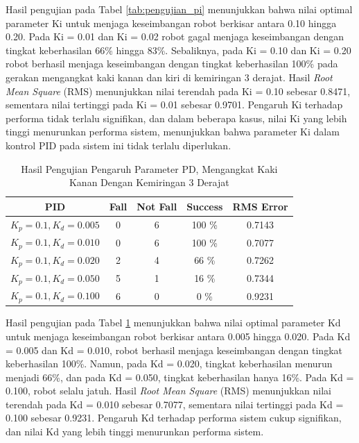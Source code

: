 \begin{enumerate}[label=\Alph*.]
        \hspace*{1em} Hasil pengujian pada Tabel \ref{tab:pengujian_pi} menunjukkan bahwa nilai optimal parameter Ki untuk menjaga keseimbangan robot berkisar antara 0.10 hingga 0.20. Pada Ki = 0.01 dan Ki = 0.02  robot gagal menjaga keseimbangan dengan tingkat keberhasilan 66\% hingga 83\%. Sebaliknya, pada Ki = 0.10 dan Ki = 0.20  robot berhasil menjaga keseimbangan dengan tingkat keberhasilan 100\% pada gerakan mengangkat kaki kanan dan kiri di kemiringan 3 derajat. Hasil \textit{Root Mean Square} (RMS) menunjukkan nilai terendah pada Ki = 0.10 sebesar 0.8471, sementara nilai tertinggi pada Ki = 0.01 sebesar 0.9701. Pengaruh Ki terhadap performa tidak terlalu signifikan, dan dalam beberapa kasus, nilai Ki yang lebih tinggi menurunkan performa sistem, menunjukkan bahwa parameter Ki dalam kontrol PID pada sistem ini tidak terlalu diperlukan.

        \begin{table}[h]
            \centering
            \caption{Hasil Pengujian Pengaruh Parameter PD, Mengangkat Kaki Kanan Dengan Kemiringan 3 Derajat}
            \begin{tabular}{|c|c|c|c|c|}
                \hline
                \textbf{PID} & \textbf{Fall} & \textbf{Not Fall} & \textbf{Success} & RMS Error \\
                \hline
                $K_p = 0.1, K_d = 0.005$ & 0 & 6 & 100 \% & 0.7143 \\
                $K_p = 0.1, K_d = 0.010$ & 0 & 6 & 100 \% & 0.7077 \\
                $K_p = 0.1, K_d = 0.020$ & 2 & 4 & 66  \% & 0.7262 \\
                $K_p = 0.1, K_d = 0.050$ & 5 & 1 & 16  \% & 0.7344 \\
                $K_p = 0.1, K_d = 0.100$ & 6 & 0 & 0   \% & 0.9231 \\          
                \hline
            \end{tabular}
            \label{tab:pengujian_pd}
        \end{table}

        \hspace*{1em} Hasil pengujian pada Tabel \ref{tab:pengujian_pd} menunjukkan bahwa nilai optimal parameter Kd untuk menjaga keseimbangan robot berkisar antara 0.005 hingga 0.020. Pada Kd = 0.005 dan Kd = 0.010, robot berhasil menjaga keseimbangan dengan tingkat keberhasilan 100\%. Namun, pada Kd = 0.020, tingkat keberhasilan menurun menjadi 66\%, dan pada Kd = 0.050, tingkat keberhasilan hanya 16\%. Pada Kd = 0.100, robot selalu jatuh. Hasil \textit{Root Mean Square} (RMS) menunjukkan nilai terendah pada Kd = 0.010 sebesar 0.7077, sementara nilai tertinggi pada Kd = 0.100 sebesar 0.9231. Pengaruh Kd terhadap performa sistem cukup signifikan, dan nilai Kd yang lebih tinggi menurunkan performa sistem.

\end{enumerate}